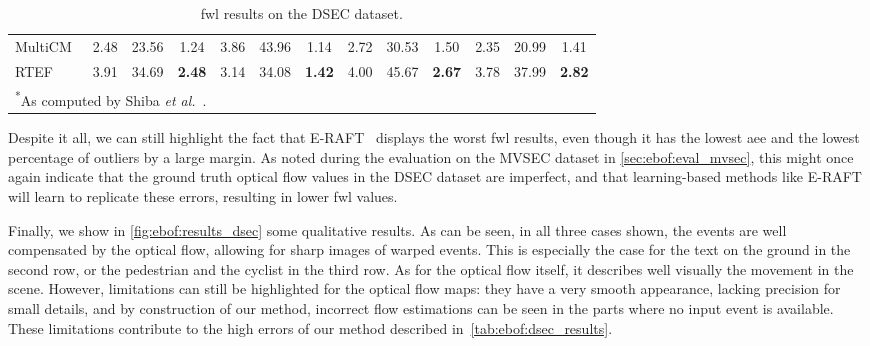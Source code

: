 \begin{table}[ht]
{\begin{tabular}{@{}lcccccccccccc@{}}
      MultiCM~\cite{Shiba2022SecretsOE} & 2.48 & 23.56 & 1.24 & 3.86 & 43.96 & 1.14 & 2.72 & 30.53 & 1.50 & 2.35 & 20.99 & 1.41 \\
      RTEF & 3.91 & 34.69 & \textbf{2.48} & 3.14 & 34.08 & \textbf{1.42} & 4.00 & 45.67 & \textbf{2.67} & 3.78 & 37.99 & \textbf{2.82} \\
      \bottomrule
      \multicolumn{10}{l}{\textsuperscript{*}As computed by Shiba \textit{et al.}~\cite{Shiba2022SecretsOE}.}
    \end{tabular}
  }
  \caption{\acrshort{fwl} results on the DSEC dataset.}\label{tab:ebof:dsec_fwl_results}
\end{table}

Despite it all, we can still highlight the fact that E-RAFT~\cite{Gehrig2021DenseOF} displays the worst \acrshort{fwl} results, even though it has the lowest \acrshort{aee} and the lowest percentage of outliers by a large margin. As noted during the evaluation on the MVSEC dataset in \cref{sec:ebof:eval_mvsec}, this might once again indicate that the ground truth optical flow values in the DSEC dataset are imperfect, and that learning-based methods like E-RAFT will learn to replicate these errors, resulting in lower \acrshort{fwl} values.

Finally, we show in \cref{fig:ebof:results_dsec} some qualitative results. As can be seen, in all three cases shown, the events are well compensated by the optical flow, allowing for sharp images of warped events. This is especially the case for the text on the ground in the second row, or the pedestrian and the cyclist in the third row. As for the optical flow itself, it describes well visually the movement in the scene. However, limitations can still be highlighted for the optical flow maps: they have a very smooth appearance, lacking precision for small details, and by construction of our method, incorrect flow estimations can be seen in the parts where no input event is available. These limitations contribute to the high errors of our method described in~\cref{tab:ebof:dsec_results}.

